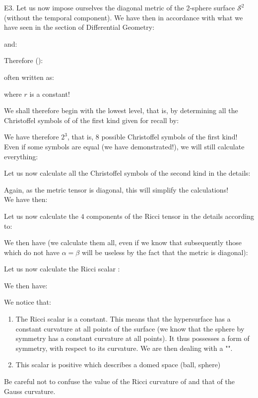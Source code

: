 	\begin{tcolorbox}[colframe=black,colback=white,sharp corners]
	E3. Let us now impose ourselves the diagonal metric of the 2-sphere surface $\mathcal{S}^2$ (without the temporal component). We have then in accordance with what we have seen in the section of Differential Geometry:
	
	and:
	
	Therefore ():
	
	often written as:
	
	where $r$ is a constant!

	We shall therefore begin with the lowest level, that is, by determining all the Christoffel symbols of of the first kind given for recall by:
	
	We have therefore $2^3$, that is, $8$ possible Christoffel symbols of the first kind! Even if some symbols are equal (we have demonstrated!), we will still calculate everything:
	
	\end{tcolorbox}
	
	\begin{tcolorbox}[colframe=black,colback=white,sharp corners]
	
	Let us now calculate all the Christoffel symbols of the second kind in the details:
	
	Again, as the metric tensor is diagonal, this will simplify the calculations!\\

	We have then:
	
	Let us now calculate the $4$ components of the Ricci tensor in the details according to:
	
	We then have (we calculate them all, even if we know that subsequently those which do not have $\alpha=\beta$ will be useless by the fact that the metric is diagonal):
	
	\end{tcolorbox}
	
	
	\begin{tcolorbox}[colframe=black,colback=white,sharp corners]
	
	Let us now calculate the Ricci scalar :
	
	We then have:
	
	We notice that:
	\begin{enumerate}
		\item The Ricci scalar is a constant. This means that the hypersurface has a constant curvature at all points of the surface (we know that the sphere by symmetry has a constant curvature at all points). It thus possesses a form of symmetry, with respect to its curvature. We are then dealing with a "".

		\item This scalar is positive which describes a domed space (ball, sphere)
	\end{enumerate}
	\end{tcolorbox}
	\begin{tcolorbox}[title=Remark,colframe=black,arc=10pt]
	Be careful not to confuse the value of the Ricci curvature of and that of the Gauss curvature.
	\end{tcolorbox}
	
